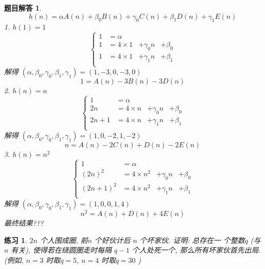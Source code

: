 \documentclass[mode=geye, chinesefont=founder]{elegantnote}
\newtheorem{exercise}{练习}
\newtheorem{answer}{题目解答}
\begin{document}
\begin{answer}
	\begin{equation*}
		h(n)=\alpha A(n)+\beta_0 B(n)+ \gamma_0 C(n)+\beta_1 D(n) + \gamma_1 E(n)
	\end{equation*}
	1. $ h(1)=1 $ 
	\begin{equation*}
		\left\{
			\begin{array}{llll}
				1 &= \alpha &&\\
				1 &= 4\times 1 &+ \gamma_0 n &+ \beta_0\\
				1 &= 4\times 1 &+ \gamma_1 n &+ \beta_1\\
			\end{array}
		\right.
	\end{equation*}
	解得 $ (\alpha, \beta_0,\gamma_0,\beta_1,\gamma_1)=(1,-3,0,-3,0) $ 
	\begin{equation*}
		1 = A(n)-3B(n)-3D(n)
	\end{equation*}
	2. $ h(n)=n $ 
	\begin{equation*}
		\left\{
			\begin{array}{llll}
				1 &= \alpha &&\\
				2n &= 4\times n &+ \gamma_0 n &+ \beta_0\\
				2n+1 &= 4\times n &+ \gamma_1 n &+ \beta_1\\
			\end{array}
		\right.
	\end{equation*}
	解得 $ (\alpha, \beta_0,\gamma_0,\beta_1,\gamma_1)=(1,0,-2,1,-2) $ 
	\begin{equation*}
		n = A(n)-2C(n)+D(n)-2E(n)
	\end{equation*}
	3. $ h(n)=n^2 $ 
	\begin{equation*}
		\left\{
			\begin{array}{llll}
				1 &= \alpha &&\\
				(2n)^2 &= 4\times n^2 &+ \gamma_0 n &+ \beta_0\\
				(2n+1)^2 &= 4\times n^2 &+ \gamma_1 n &+ \beta_1\\
			\end{array}
		\right.
	\end{equation*}
	解得 $ (\alpha, \beta_0,\gamma_0,\beta_1,\gamma_1)=(1,0,0,1,4) $ 
	\begin{equation*}
		n^2 = A(n)+D(n)+4E(n)
	\end{equation*}
	最终结果???
\end{answer}

\begin{exercise}
	$ 2 n $  个人围成圈, 前$ n $ 个好伙计后 $ n $ 个坏家伙. 证明: 总存在一
个整数$  q $  (与 $ n $ 有关), 使得若在绕圆圈走时每隔 $ q - 1 $  个人处死一个, 那么所有坏家伙首先出局.\\
(例如, $ n=3 $ 时取$ q=5 $, $ n=4 $ 时取$ q=30
 $ )
\end{exercise}
\end{document}
